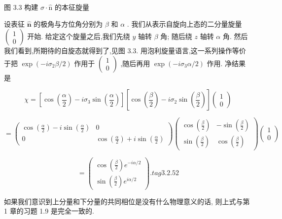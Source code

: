 图 3.3 构建 $\sigma \cdot \widehat{\mathrm{n}}$ 的本征旋量

设表征 $\widehat{\mathbf{n}}$ 的极角与方位角分别为 $\beta$ 和 $\alpha$ . 我们从表示自旋向上态的二分量旋量 $\left( \begin{array}{l} 1 \\ 0 \end{array}\right)$ 开始. 给定这个旋量之后,我们先绕 $y$ 轴转 $\beta$ 角; 随后绕 $z$ 轴转 $\alpha$ 角. 然后我们看到,所期待的自旋态就得到了,见图 3.3. 用泡利旋量语言,这一系列操作等价于把 $\exp \left( {-i{\sigma }_{2}\beta /2}\right)$ 作用于 $\left( \begin{array}{l} 1 \\ 0 \end{array}\right)$ ,随后再用 $\exp \left( {-i{\sigma }_{3}\alpha /2}\right)$ 作用. 净结果是

$$
\chi = \left\lbrack {\cos \left( \frac{\alpha }{2}\right) - i{\sigma }_{3}\sin \left( \frac{\alpha }{2}\right) }\right\rbrack \left\lbrack {\cos \left( \frac{\beta }{2}\right) - i{\sigma }_{2}\sin \left( \frac{\beta }{2}\right) }\right\rbrack \left( \begin{array}{l} 1 \\ 0 \end{array}\right)
$$

$$
= \left( \begin{matrix} \cos \left( \frac{\alpha }{2}\right) - i\sin \left( \frac{\alpha }{2}\right) & 0 \\ 0 & \cos \left( \frac{\alpha }{2}\right) + i\sin \left( \frac{\alpha }{2}\right) \end{matrix}\right) \left( \begin{matrix} \cos \left( \frac{\beta }{2}\right) & - \sin \left( \frac{\beta }{2}\right) \\ \sin \left( \frac{\beta }{2}\right) & \cos \left( \frac{\beta }{2}\right) \end{matrix}\right) \left( \begin{array}{l} 1 \\ 0 \end{array}\right)
$$

$$
= \left( \begin{array}{l} \cos \left( \frac{\beta }{2}\right) {e}^{-{i\alpha }/2} \\ \sin \left( \frac{\beta }{2}\right) {e}^{{i\alpha }/2} \end{array}\right) . tag{3. 2.52}
$$

如果我们意识到上分量和下分量的共同相位是没有什么物理意义的话, 则上式与第 1 章的习题 1.9 是完全一致的.
